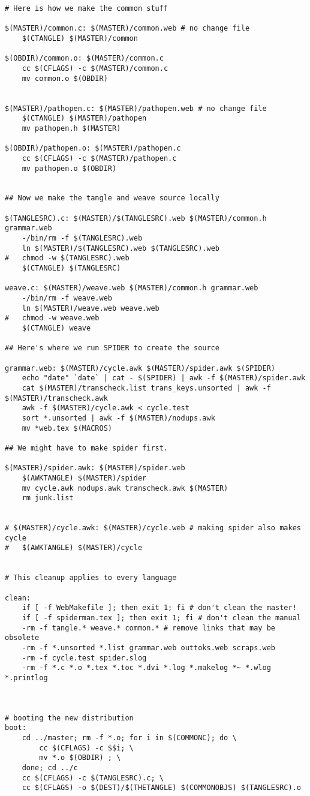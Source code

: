 \begin{verbatim}
# Here is how we make the common stuff

$(MASTER)/common.c: $(MASTER)/common.web # no change file
	$(CTANGLE) $(MASTER)/common 

$(OBDIR)/common.o: $(MASTER)/common.c
	cc $(CFLAGS) -c $(MASTER)/common.c
	mv common.o $(OBDIR)


$(MASTER)/pathopen.c: $(MASTER)/pathopen.web # no change file
	$(CTANGLE) $(MASTER)/pathopen 
	mv pathopen.h $(MASTER)

$(OBDIR)/pathopen.o: $(MASTER)/pathopen.c
	cc $(CFLAGS) -c $(MASTER)/pathopen.c
	mv pathopen.o $(OBDIR)


## Now we make the tangle and weave source locally

$(TANGLESRC).c: $(MASTER)/$(TANGLESRC).web $(MASTER)/common.h grammar.web
	-/bin/rm -f $(TANGLESRC).web
	ln $(MASTER)/$(TANGLESRC).web $(TANGLESRC).web
#	chmod -w $(TANGLESRC).web
	$(CTANGLE) $(TANGLESRC)

weave.c: $(MASTER)/weave.web $(MASTER)/common.h grammar.web 
	-/bin/rm -f weave.web
	ln $(MASTER)/weave.web weave.web
#	chmod -w weave.web
	$(CTANGLE) weave 

## Here's where we run SPIDER to create the source

grammar.web: $(MASTER)/cycle.awk $(MASTER)/spider.awk $(SPIDER)
	echo "date" `date` | cat - $(SPIDER) | awk -f $(MASTER)/spider.awk
	cat $(MASTER)/transcheck.list trans_keys.unsorted | awk -f $(MASTER)/transcheck.awk
	awk -f $(MASTER)/cycle.awk < cycle.test
	sort *.unsorted | awk -f $(MASTER)/nodups.awk
	mv *web.tex $(MACROS)

## We might have to make spider first.

$(MASTER)/spider.awk: $(MASTER)/spider.web
	$(AWKTANGLE) $(MASTER)/spider
	mv cycle.awk nodups.awk transcheck.awk $(MASTER)
	rm junk.list


# $(MASTER)/cycle.awk: $(MASTER)/cycle.web # making spider also makes cycle
# 	$(AWKTANGLE) $(MASTER)/cycle


# This cleanup applies to every language

clean:
	if [ -f WebMakefile ]; then exit 1; fi # don't clean the master!
	if [ -f spiderman.tex ]; then exit 1; fi # don't clean the manual
	-rm -f tangle.* weave.* common.* # remove links that may be obsolete
	-rm -f *.unsorted *.list grammar.web outtoks.web scraps.web 
	-rm -f cycle.test spider.slog
	-rm -f *.c *.o *.tex *.toc *.dvi *.log *.makelog *~ *.wlog *.printlog



# booting the new distribution
boot:
	cd ../master; rm -f *.o; for i in $(COMMONC); do \
		cc $(CFLAGS) -c $$i; \
		mv *.o $(OBDIR) ; \
	done; cd ../c
	cc $(CFLAGS) -c $(TANGLESRC).c; \
	cc $(CFLAGS) -o $(DEST)/$(THETANGLE) $(COMMONOBJS) $(TANGLESRC).o

 
\end{verbatim}
\endgroup

